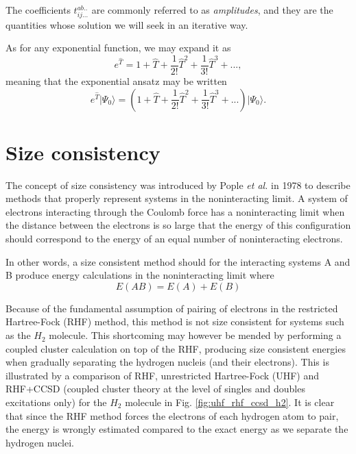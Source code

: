 The coefficients $t^{ab..}_{ij...}$ are commonly referred to as \emph{amplitudes}, and they are the quantities whose solution we will seek in an iterative way.

As for any exponential function, we may expand it as
\begin{equation}
e^{\hat{T}} = 1 + \hat{T} + \frac{1}{2!} \hat{T}^2 + \frac{1}{3!} \hat{T}^3 + ... ,
\end{equation}
meaning that  the exponential ansatz may be written
\begin{equation}
e^{\hat{T}}  \vert \Psi_0 \rangle = (1 + \hat{T} + \frac{1}{2!} \hat{T}^2 + \frac{1}{3!} \hat{T}^3 + ...) \vert \Psi_0 \rangle .
\end{equation}

\section{Size consistency}
The concept of size consistency was introduced by Pople {\em et al.} in 1978
\cite{Pople} to describe methods that properly represent systems in
the noninteracting limit. A system of electrons interacting through
the Coulomb force has a noninteracting limit when the distance
between the electrons is so large that the energy of this
configuration should correspond to the energy of an equal number of
noninteracting electrons.

In other words, a size consistent method should for the interacting
systems A and B produce energy calculations in the noninteracting
limit where \cite[p.12]{ShavittBartlett2009}
\begin{equation}
E(AB) = E(A) + E(B)
\end{equation}

Because of the fundamental assumption of pairing of electrons in the
restricted Hartree-Fock (RHF) method, this method is not size consistent for
systems such as the $H_2$ molecule. This shortcoming may however be
mended by performing a coupled cluster calculation on top of the RHF,
producing size consistent energies when gradually separating the
hydrogen nucleis (and their electrons). This is illustrated by a
comparison of RHF, unrestricted Hartree-Fock (UHF) and RHF+CCSD (coupled cluster theory at the level of singles and doubles excitations only) 
for the $H_2$ molecule in Fig.
\ref{fig:uhf_rhf_ccsd_h2}. It is clear that since the RHF method forces the
electrons of each hydrogen atom to pair, the energy is wrongly estimated
compared to the exact energy as we separate the hydrogen nuclei. 

